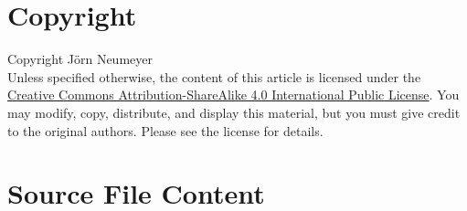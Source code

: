 \documentclass{article}
\begin{document}
  \section{Copyright}
  Copyright \textcopyright {} J\"orn Neumeyer\\
  Unless specified otherwise, the content of this article is licensed under the \href{https://creativecommons.org/licenses/by-sa/4.0/legalcode}{Creative Commons Attribution-ShareAlike 4.0 International Public License}.
  You may modify, copy, distribute, and display this material, but you must give credit to the original authors. Please see the license for details.
  \newpage
  \section{Source File Content}
  
  
  
  
  \newpage
  
\end{document}
